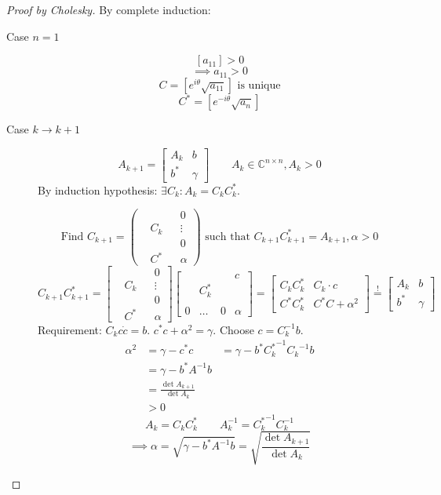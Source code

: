 \documentclass{article}
\numberwithin{lecref}{section}
\begin{document}
\begin{proof}[Proof by Cholesky]
  By complete induction:
  \begin{description}
    \item[Case $n = 1$]
      \[ [a_{11}] > 0 \]
      \[ \implies a_{11} > 0 \]
      \[ C = [ e^{i\theta} \sqrt{a_{11}}] \text{ is unique} \]
      \[ C^* = [e^{-i\theta} \sqrt{a_n}] \]
    \item[Case $k \to k+1$]
      \[ A_{k+1} = \begin{bmatrix} A_k & b \\ b^* & \gamma \end{bmatrix} \qquad A_k \in \mathbb C^{n \times n}, A_k > 0 \]
      By induction hypothesis:
      $\exists C_k: A_k = C_k C_k^*$.

      \[ \text{Find } C_{k+1} = \begin{pmatrix} &  & & 0 \\ & C_k & & \vdots \\ & & & 0 \\ & C^* & & \alpha \end{pmatrix} \text{ such that } C_{k+1} C_{k+1}^* = A_{k+1}, \alpha > 0 \]
      \[ C_{k+1} C_{k+1}^* = \begin{bmatrix} &  & & 0 \\ & C_k & & \vdots \\ & & & 0 \\ & C^* & & \alpha \end{bmatrix} \begin{bmatrix} &  & & c \\ & C_k^* & & \\ & & & \\ 0 & \dots & 0 & \alpha \end{bmatrix} = \left[\begin{array}{c|c} C_k C_k^* & C_k \cdot c \\ C^* C_k^* & C^* C + \alpha^2 \end{array}\right]  \overset!= \begin{bmatrix} A_k & b \\ b^* & \gamma \end{bmatrix} \]
      Requirement: $C_k c\dot c = b$. $c^* c + \alpha^2 = \gamma$.
      Choose $c = C_k^{-1} b$.
      \begin{align*}
        \alpha^2 &= \gamma - c^* c
          &= \gamma - b^* {C_k^*}^{-1} {C_k}^{-1} b \\
          &= \gamma - b^* A^{-1} b \\
          &= \frac{\det{A_{k+1}}}{\det{A_k}} \\
          &> 0
      \end{align*}
      \[ A_k = C_k C^*_k \qquad A_k^{-1} = {C_k^*}^{-1} C_k^{-1} \]
      \[ \implies \alpha = \sqrt{\gamma - b^* A^{-1} b} = \sqrt{\frac{\det{A_{k+1}}}{\det{A_k}}} \]
  \end{description}
\end{proof}
\end{document}
